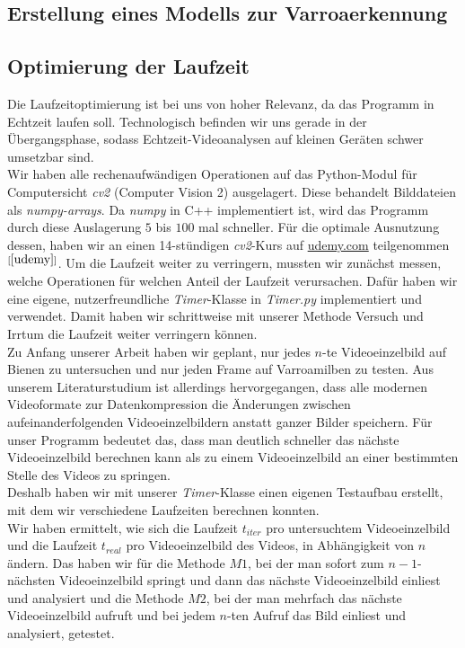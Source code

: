 \documentclass[11pt,a4paper]{article}
\newcommand{\bibRef}[1]{\hyperlink{#1}{$^{[\ref*{#1}{}]}$}}
\begin{document}
\subsection{Erstellung eines Modells zur Varroaerkennung}
\subsection{Optimierung der Laufzeit}
Die Laufzeitoptimierung ist bei uns von hoher Relevanz, da das Programm in Echtzeit laufen soll. Technologisch befinden wir uns gerade in der Übergangsphase, sodass Echtzeit-Videoanalysen auf kleinen Geräten schwer umsetzbar sind.\\
Wir haben alle rechenaufwändigen Operationen auf das Python-Modul für Computersicht \textit{cv2} (Computer Vision 2) ausgelagert. Diese behandelt Bilddateien als \textit{numpy-arrays}. Da \textit{numpy} in C++ implementiert ist, wird das Programm durch diese Auslagerung $5$ bis $100$ mal schneller. Für die optimale Ausnutzung dessen, haben wir an einen 14-stündigen \textit{cv2}-Kurs auf \url{udemy.com} teilgenommen\bibRef{udemy}.
Um die Laufzeit weiter zu verringern, mussten wir zunächst messen, welche Operationen für welchen Anteil der Laufzeit verursachen. Dafür haben wir eine eigene, nutzerfreundliche \textit{Timer}-Klasse in \textit{Timer.py} implementiert und verwendet. Damit haben wir schrittweise mit unserer Methode Versuch und Irrtum die Laufzeit weiter verringern können.\\
Zu Anfang unserer Arbeit haben wir geplant, nur jedes $n$-te Videoeinzelbild auf Bienen zu untersuchen und nur jeden Frame auf Varroamilben zu testen. Aus unserem Literaturstudium ist allerdings hervorgegangen, dass alle modernen Videoformate zur Datenkompression die Änderungen zwischen aufeinanderfolgenden Videoeinzelbildern anstatt ganzer Bilder speichern. Für unser Programm bedeutet das, dass man deutlich schneller das nächste Videoeinzelbild berechnen kann als zu einem Videoeinzelbild an einer bestimmten Stelle des Videos zu springen.\\
Deshalb haben wir mit unserer \textit{Timer}-Klasse einen eigenen Testaufbau erstellt, mit dem wir verschiedene Laufzeiten berechnen konnten.\\
Wir haben ermittelt, wie sich die Laufzeit $t_{iter}$ pro untersuchtem Videoeinzelbild und die Laufzeit $t_{real}$ pro Videoeinzelbild des Videos, in Abhängigkeit von $n$ ändern. Das haben wir für die Methode $M1$, bei der man sofort zum $n-1$-nächsten Videoeinzelbild springt und dann das nächste Videoeinzelbild einliest und analysiert und die Methode $M2$, bei der man mehrfach das nächste Videoeinzelbild aufruft und bei jedem $n$-ten Aufruf das Bild einliest und analysiert, getestet.
\end{document}
